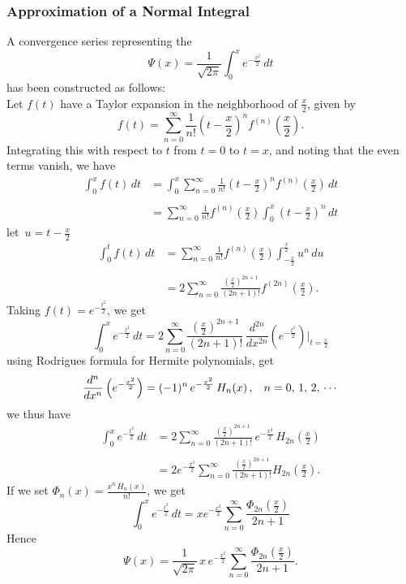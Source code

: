 \documentclass[12pt,a4paper]{report}
\theoremstyle{definition}
\theoremstyle{plain}
\begin{document}
\subsubsection{Approximation of a Normal Integral}
\vspace*{-5mm}
A convergence series representing the 
$$\Psi(x)  = \frac{1}{\sqrt{2\pi}}\int_0^{x}e^{-\frac{x^2}{2}}\, dt$$ has been constructed as follows:\\
Let $f(t)$ have a Taylor expansion in the neighborhood of $\frac{x}{2}$, given by
$$f(t) = \sum_{n=0}^{\infty}\frac{1}{n!}\left(t - \frac{x}{2}\right)^nf^{(n)}\left(\frac{x}{2}\right).$$ Integrating this with respect to  $t$ from $t = 0$ to $t = x$, and noting that the even terms vanish, we have
\begin{align*}
\int_0^xf(t)\, dt & = \int_0^x\sum^{\infty}_{n=0} \frac{1}{n!}\left(t - \frac{x}{2}\right)^nf^{(n)}\left(\frac{x}{2}\right)\, dt\\\\
& = \sum_{n=0}^{\infty}\frac{1}{n!}f^{(n)}\left(\frac{x}{2}\right)\int_0^x\left(t - \frac{x}{2}\right)^n\, dt
\end{align*}
let $\, u = t - \frac{x}{2}$
\begin{align*}
\int_0^tf(t)\, dt & = \sum_{n=0}^{\infty} \frac{1}{n!}f^{(n)}\left(\frac{x}{2}\right)\int^{\frac{x}{2}}_{-\frac{x}{2}}u^n\, du\\\\
 & = 2\sum_{n=0}^{\infty}\frac{\left(\frac{x}{2}\right)^{2n+1}}{(2n+1)!}f^{(2n)}\left(\frac{x}{2}\right).
\end{align*}
Taking $f(t) = e^{-\frac{t^2}{2}}$, we get
$$\int_0^xe^{-\frac{t^2}{2}}\, dt = 2\sum_{n=0}^{\infty} \frac{\left(\frac{x}{2}\right)^{2n + 1}}{(2n + 1)!}\, \frac{d^{2n}}{dx^{2n}}\left( e^{-\frac{t^2}{2}}\right)\Bigg|_{t = \frac{x}{2}}$$
using Rodrigues formula for Hermite polynomials, get
$$\frac{d^n}{dx^n}\left(e^{-\frac{x^2}{2}}\right) = (-1)^n\, e^{-\frac{x^2}{2}}\, H_n(x)\, , \hspace{0.3cm} n = 0, \, 1, \, 2, \, \cdots$$
we thus have
\begin{align*}
\int_0^xe^{-\frac{t^2}{2}}\, dt & = 2\sum^{\infty}_{n=0} \frac{\left(\frac{x}{2}\right)^{2n+1}}{(2n+1)!}\, e^{-\frac{x^2}{2}}\, H_{2n}\left(\frac{x}{2}\right)\\\\
& = 2 e^{-\frac{x^2}{2}}\sum^{\infty}_{n=0} \frac{\left(\frac{x}{2}\right)^{2n +1}}{(2n + 1)!} H_{2n}\left(\frac{x}{2}\right).
\end{align*}
If we set $\Phi_n(x) = \frac{x^n\, H_n(x)}{n!}$, we get 
$$\int_0^xe^{-\frac{t^2}{2}}\, dt = xe^{-\frac{x^2}{2}}\sum_{n=0}^{\infty}\frac{\Phi_{2n}\left(\frac{x}{2}\right)}{2n + 1}$$
Hence
$$\Psi(x) = \frac{1}{\sqrt{2\pi}}\,x\,e^{-\frac{x^2}{2}}\sum_{n=0}^{\infty}\frac{\Phi_{2n}\left(\frac{x}{2}\right)}{2n + 1}.$$
\end{document}
